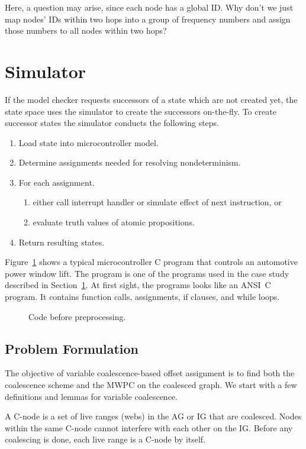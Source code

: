 \documentclass[acmcmpt, twoside]{acmsmall}
\begin{document}
Here, a question may arise, since each node has a global ID. Why
don't we just map nodes' IDs within two hops into a group of
frequency numbers and assign those numbers to all nodes within two
hops?

\section{Simulator}
\label{sec:sim}

If the model checker requests successors of a state which are not
created yet, the state space uses the simulator to create the
successors on-the-fly. To create successor states the simulator
conducts the following steps.
\begin{enumerate}
\item Load state into microcontroller model.
\item Determine assignments needed for resolving nondeterminism.
\item For each assignment.
      \begin{enumerate}
      \item either call interrupt handler or simulate effect of next instruction, or
      \item evaluate truth values of atomic propositions.
      \end{enumerate}
\item Return resulting states.
\end{enumerate}
Figure~\ref{fig:one} shows a typical microcontroller C program that
controls an automotive power window lift. The program is one of the
programs used in the case study described in Section~\ref{sec:sim}.
At first sight, the programs looks like an ANSI~C program. It
contains function calls, assignments, if clauses, and while loops.
\begin{figure}
\caption{Code before preprocessing.}
\label{fig:one}
\end{figure}

\subsection{Problem Formulation}

The objective of variable coalescence-based offset assignment is to find
both the coalescence scheme and the MWPC on the coalesced graph. We start
with a few definitions and lemmas for variable coalescence.

\begin{definition}A C-node is a set of
live ranges (webs) in the AG or IG that are coalesced. Nodes within the same
C-node cannot interfere with each other on the IG. Before any coalescing is
done, each live range is a C-node by itself.
\end{definition}
\end{document}
